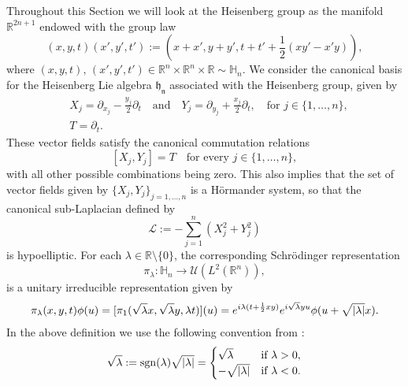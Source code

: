 \documentclass[12pt,oneside,a4paper]{book}
\numberwithin{equation}{section}     %
\theoremstyle{plain}
\theoremstyle{definition}
\newcommand{\R}{{\mathbb R}}
\newcommand{\h}{{\mathbb H}}
\newcommand{\Rn}{{\R}^n}
\newcommand{\slp}{{\mathcal L}}
\begin{document}
Throughout this Section we will look at the Heisenberg group as the manifold $\R^{2n+1}$ endowed with the group law
\[
(x,y,t)(x',y',t'):=(x+x',y+y',t+t'+\frac{1}{2}(xy'-x'y)),
\]
where $(x,y,t),\, (x',y',t')\in\R^n\times\R^n\times\R\sim\h_n$. We consider the canonical basis for the {Heisenberg Lie algebra} $\mathfrak{h_n}$ associated with the Heisenberg group, given by
\begin{align*}
&X_j=\partial_{x_j}-\frac{y_j}{2}\partial_t\quad\text{and}\quad Y_j=\partial_{y_j}+\frac{x_j}{2}\partial_t,\quad\text{for } j\in\{1,\dots,n\},\\
&T=\partial_t.
\end{align*}
These vector fields satisfy the canonical commutation relations 
\[
[X_j,Y_j]=T \quad\text{for every } j\in\{1,\dots,n\},
\] 
with all other possible combinations being zero. This also implies that the set of vector fields given by $\{X_j,Y_j\}_{j=1,\dots,n}$ is a H\"ormander system, so that the canonical sub-Laplacian defined by
\begin{equation*}
\slp:=-\sum_{j=1}^n(X^2_j+Y_j^2)
\end{equation*}
is hypoelliptic.
For each $\lambda\in\R\setminus\{0\}$, the corresponding Schr\"odinger representation 
\[
\pi_\lambda:\mathbb{H}_n\rightarrow\mathcal{U}(L^2(\Rn)),
\]
is a unitary irreducible representation given by 
\begin{align}\notag
\pi_\lambda(x,y,t)\phi(u)=[\pi_1(\sqrt\lambda x,\sqrt\lambda y,\lambda t)](u)=e^{i\lambda(t+\frac{1}{2}xy)}e^{i\sqrt\lambda yu}\phi(u+\sqrt{|\lambda|}x).
\end{align}
In the above definition we use the following convention from \cite{FR2016}:
\begin{align*}
\sqrt\lambda:={\rm sgn}(\lambda)\sqrt{|\lambda|}=
\begin{cases}
\sqrt\lambda&\text{if }\lambda>0,\\
-\sqrt{|\lambda|}&\text{if }\lambda<0.
\end{cases}
\end{align*}
\end{document}
